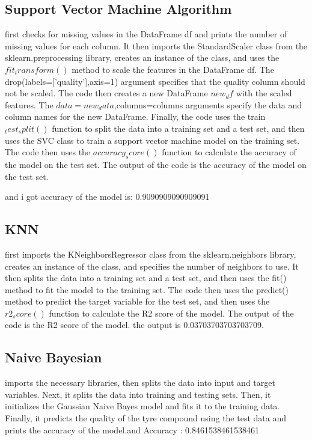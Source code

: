 \documentclass{article}
\begin{document}
\pagebreak
\subsection{Support Vector Machine Algorithm}

first checks for missing values in the DataFrame df and prints the number of missing values for each column. It then imports the StandardScaler class from the sklearn.preprocessing library, creates an instance of the class, and uses the $fit_transform()$ method to scale the features in the DataFrame df. The drop(labels=['quality'],axis=1) argument specifies that the quality column should not be scaled. The code then creates a new DataFrame $new_df$ with the scaled features. The $data=new_data$,columns=columns arguments specify the data and column names for the new DataFrame. Finally, the code uses the train$_test_split()$ function to split the data into a training set and a test set, and then uses the SVC class to train a support vector machine model on the training set. The code then uses the $accuracy_score()$ function to calculate the accuracy of the model on the test set. The output of the code is the accuracy of the model on the test set.

and i got accuracy of the model is: 0.9090909090909091

\subsection{KNN}

first imports the KNeighborsRegressor class from the sklearn.neighbors library, creates an instance of the class, and specifies the number of neighbors to use. It then splits the data into a training set and a test set, and then uses the fit() method to fit the model to the training set. The code then uses the predict() method to predict the target variable for the test set, and then uses the $r2_score()$ function to calculate the R2 score of the model. The output of the code is the R2 score of the model. the output is 0.03703703703703709.

\subsection{Naive Bayesian}

 imports the necessary libraries, then splits the data into input and target variables. Next, it splits the data into training and testing sets. Then, it initializes the Gaussian Naive Bayes model and fits it to the training data. Finally, it predicts the quality of the tyre compound using the test data and prints the accuracy of the model.and 
 Accuracy : 0.8461538461538461
\end{document}
